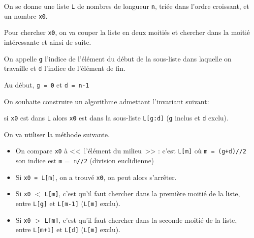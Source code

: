 \begin{prop}
On se donne une liste \lstinline{L} de nombres de longueur \lstinline{n},     {triée dans l'ordre croissant}, et un nombre \lstinline{x0}. 

Pour chercher \lstinline{x0}, on va couper la liste en deux moitiés et chercher dans la moitié intéressante et ainsi de suite.

On appelle \lstinline{g} {l'indice} de l'élément du début de la sous-liste dans laquelle on travaille et \lstinline{d}     {l'indice} de l'élément de fin.

Au début, \lstinline{g = 0} et \lstinline{d = n-1} 

On souhaite construire un algorithme admettant l'invariant suivant:
\bigskip

\centerline{{si \lstinline{x0} est dans \lstinline{L} alors \lstinline{x0} est dans la sous-liste \lstinline{L[g:d]} (\lstinline{g} inclus et \lstinline{d} exclu).}}
\end{prop}



On va utiliser la méthode suivante.
\begin{itemize}
\item On compare \lstinline{x0} à <<~l'élément du milieu~>> : c'est \lstinline{L[m]} où \lstinline{m = (g+d)//2}
son indice est \lstinline{m} =\lstinline{ n//2} (division euclidienne)

\item Si \lstinline{x0 = L[m]}, on a trouvé \lstinline{x0}, on peut alors s'arrêter.
\item Si \lstinline{x0} $<$ \lstinline{L[m]}, c'est qu'il faut chercher dans la première moitié de la liste, entre \lstinline{L[g]} et  \lstinline{L[m-1]} (\lstinline{L[m]} exclu).
\item Si \lstinline{x0} $>$ \lstinline{L[m]}, c'est qu'il faut chercher dans la seconde moitié de la liste, entre \lstinline{L[m+1]} et \lstinline{L[d]} (\lstinline{L[m]} exclu).
\end{itemize}

